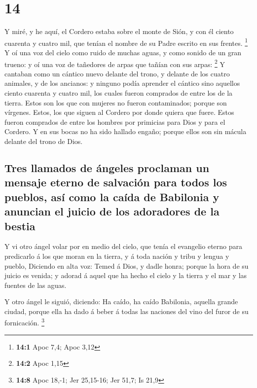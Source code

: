 \hypertarget{section-13}{%
\section{14}\label{section-13}}

 Y miré, y he aquí, el Cordero estaba sobre el monte de
Sión, y con él ciento cuarenta y cuatro mil, que tenían el nombre de su
Padre escrito en sus frentes. \footnote{\textbf{14:1} Apoc 7,4; Apoc
  3,12}  Y oí una voz del cielo como ruido de muchas aguas,
y como sonido de un gran trueno: y oí una voz de tañedores de arpas que
tañían con sus arpas: \footnote{\textbf{14:2} Apoc 1,15}  Y
cantaban como un cántico nuevo delante del trono, y delante de los
cuatro animales, y de los ancianos: y ninguno podía aprender el cántico
sino aquellos ciento cuarenta y cuatro mil, los cuales fueron comprados
de entre los de la tierra.  Estos son los que con mujeres no
fueron contaminados; porque son vírgenes. Estos, los que siguen al
Cordero por donde quiera que fuere. Estos fueron comprados de entre los
hombres por primicias para Dios y para el Cordero.  Y en sus
bocas no ha sido hallado engaño; porque ellos son sin mácula delante del
trono de Dios.

\hypertarget{tres-llamados-de-uxe1ngeles-proclaman-un-mensaje-eterno-de-salvaciuxf3n-para-todos-los-pueblos-asuxed-como-la-cauxedda-de-babilonia-y-anuncian-el-juicio-de-los-adoradores-de-la-bestia}{%
\subsection{Tres llamados de ángeles proclaman un mensaje eterno de
salvación para todos los pueblos, así como la caída de Babilonia y
anuncian el juicio de los adoradores de la
bestia}\label{tres-llamados-de-uxe1ngeles-proclaman-un-mensaje-eterno-de-salvaciuxf3n-para-todos-los-pueblos-asuxed-como-la-cauxedda-de-babilonia-y-anuncian-el-juicio-de-los-adoradores-de-la-bestia}}

 Y vi otro ángel volar por en medio del cielo, que tenía el
evangelio eterno para predicarlo á los que moran en la tierra, y á toda
nación y tribu y lengua y pueblo,  Diciendo en alta voz:
Temed á Dios, y dadle honra; porque la hora de su juicio es venida; y
adorad á aquel que ha hecho el cielo y la tierra y el mar y las fuentes
de las aguas.

 Y otro ángel le siguió, diciendo: Ha caído, ha caído
Babilonia, aquella grande ciudad, porque ella ha dado á beber á todas
las naciones del vino del furor de su fornicación. \footnote{\textbf{14:8}
  Apoc 18,-1; Jer 25,15-16; Jer 51,7; Is 21,9}


